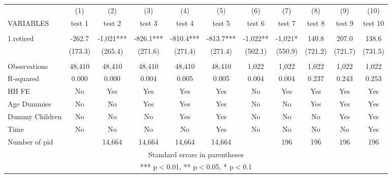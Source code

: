 \begin{tabular}{lcccccccccc} \hline
 & (1) & (2) & (3) & (4) & (5) & (6) & (7) & (8) & (9) & (10) \\
VARIABLES & test 1 & test 2 & test 3 & test 4 & test 5 & test 6 & test 7 & test 8 & test 9 & test 10 \\ \hline
 &  &  &  &  &  &  &  &  &  &  \\
1.retired & -262.7 & -1,021*** & -826.1*** & -810.4*** & -813.7*** & -1,022** & -1,021* & 140.8 & 207.0 & 138.6 \\
 & (173.3) & (265.4) & (271.6) & (271.4) & (271.4) & (502.1) & (550.9) & (721.2) & (721.7) & (731.5) \\
 &  &  &  &  &  &  &  &  &  &  \\
Observations & 48,410 & 48,410 & 48,410 & 48,410 & 48,410 & 1,022 & 1,022 & 1,022 & 1,022 & 1,022 \\
R-squared & 0.000 & 0.000 & 0.004 & 0.005 & 0.005 & 0.004 & 0.004 & 0.237 & 0.243 & 0.253 \\
HH FE & No & Yes & Yes & Yes & Yes & No & Yes & Yes & Yes & Yes \\
Age Dummies & No & No & Yes & Yes & Yes & No & No & Yes & Yes & Yes \\
Dummy Children & No & No & No & Yes & Yes & No & No & No & Yes & Yes \\
Time & No & No & No & No & Yes & No & No & No & No & Yes \\
 Number of pid &  & 14,664 & 14,664 & 14,664 & 14,664 &  & 196 & 196 & 196 & 196 \\ \hline
\multicolumn{11}{c}{ Standard errors in parentheses} \\
\multicolumn{11}{c}{ *** p$<$0.01, ** p$<$0.05, * p$<$0.1} \\
\end{tabular}
